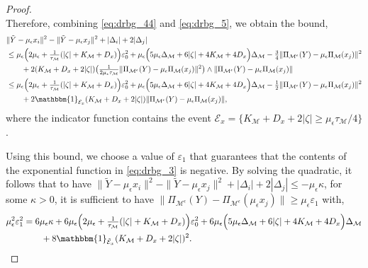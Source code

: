 \documentclass[10pt,a4paper]{amsart}
\newcommand{\M}{{\mathcal{M}}}
\newcommand{\Pieps}{\Pi_{\M^\epsilon}}
\newcommand{\gap}{\Delta_\M}
\begin{document}
\begin{proof}
\begin{equation}
\end{equation}
Therefore, combining \eqref{eq:drbg_44} and \eqref{eq:drbg_5}, we obtain the bound,
\begin{align*}
    &\|\tilde{Y} - \mu_\epsilon x_i\|^2-\|\tilde{Y} - \mu_\epsilon x_j\|^2 + |\Delta_i| + 2|\Delta_j|\\
    & \leq \mu_\epsilon \Big ( 2\mu_\epsilon + \tfrac{1}{\tau_\M} (|\zeta| + K_\M + D_x) \Big ) \varepsilon_0^2 + \mu_\epsilon \Big ( 5 \mu_\epsilon \gap + 6 |\zeta| + 4 K_\M + 4 D_x \Big ) \gap - \tfrac{3}{4} \|\Pieps(Y) - \mu_\epsilon \Pi_\M(x_j)\|^2\\
    & \qquad + 2 (K_\M + D_x + 2 |\zeta|) \big ( \tfrac{1}{2 \mu_\epsilon \tau_\M}\|\Pieps(Y) - \mu_\epsilon \Pi_\M(x_j)\|^2 \big ) \wedge \|\Pieps(Y) - \mu_\epsilon \Pi_\M(x_j)\|\\
    & \leq \mu_\epsilon \Big ( 2\mu_\epsilon + \tfrac{1}{\tau_\M} (|\zeta| + K_\M + D_x) \Big ) \varepsilon_0^2 + \mu_\epsilon \Big ( 5 \mu_\epsilon \gap + 6 |\zeta| + 4 K_\M + 4 D_x \Big ) \gap - \tfrac{1}{2} \|\Pieps(Y) - \mu_\epsilon \Pi_\M(x_j)\|^2\\
    & \qquad + 2 \mathbbm{1}_{\mathcal{E}_x} (K_\M + D_x + 2 |\zeta|) \|\Pieps(Y) - \mu_\epsilon \Pi_\M(x_j)\|,
\end{align*}
where the indicator function contains the event \(\mathcal{E}_x = \{ K_\M + D_x + 2 |\zeta| \geq \mu_\epsilon \tau_\M / 4 \}\).

Using this bound, we choose a value of \(\varepsilon_1\) that guarantees that the contents of the exponential function in \eqref{eq:drbg_3} is negative.
By solving the quadratic, it follows that to have \(\|\tilde{Y} - \mu_\epsilon x_i\|^2-\|\tilde{Y} - \mu_\epsilon x_j\|^2 + |\Delta_i| + 2|\Delta_j| \leq - \mu_\epsilon \kappa\), for some \(\kappa > 0\), it is sufficient to have \(\|\Pieps(Y) - \Pieps(\mu_\epsilon x_j)\| \geq \mu_\epsilon \varepsilon_1\) with,
\begin{align}
    \mu_\epsilon^2 \varepsilon_1^2 &= 6 \mu_\epsilon \kappa + 6 \mu_\epsilon \Big ( 2\mu_\epsilon + \tfrac{1}{\tau_\M} (|\zeta| + K_\M + D_x) \Big ) \varepsilon_0^2 + 6 \mu_\epsilon \Big ( 5 \mu_\epsilon \gap + 6 |\zeta| + 4 K_\M + 4 D_x \Big ) \gap \nonumber\\
    & \qquad + 8 \mathbbm{1}_{\tilde{\mathcal{E}}_x} (K_\M + D_x + 2 |\zeta|)^2.\label{eq:drbg_2}
\end{align}


\end{proof}
\end{document}
